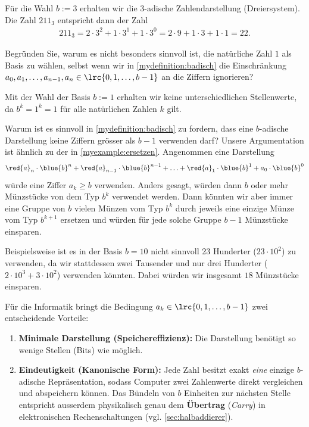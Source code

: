 \begin{myexample}
Für die Wahl $b:=3$ erhalten wir die $3$-adische Zahlendarstellung (Dreiersystem). Die Zahl $211_3$ entspricht dann der Zahl
\begin{align*}
	211_3 = 2\cdot 3^2 + 1\cdot 3^1 + 1\cdot 3^0 = 2\cdot 9 + 1\cdot 3 + 1\cdot 1 = 22.
\end{align*}
\end{myexample}

\begin{mychallenge}
	Begründen Sie, warum es nicht besonders sinnvoll ist, die natürliche Zahl $1$ als Basis zu wählen, selbst wenn wir in \cref{mydefinition:badisch} die Einschränkung $a_0, a_1, \ldots, a_{n-1}, a_{n}\in\lrc{0,1,\ldots,b-1}$ an die Ziffern ignorieren?
	\begin{myanswer}
		Mit der Wahl der Basis $b := 1$ erhalten wir keine unterschiedlichen Stellenwerte, da $b^k = 1^k = 1$ für alle natürlichen Zahlen $k$ gilt.
	\end{myanswer}
\end{mychallenge}

\begin{myremark}\label{myremark:ziffern-einschraenkung}
	Warum ist es sinnvoll in \cref{mydefinition:badisch} zu fordern, dass eine $b$-adische Darstellung keine Ziffern grösser als $b-1$ verwenden darf?
	Unsere Argumentation ist ähnlich zu der in \cref{myexample:ersetzen}. Angenommen eine Darstellung
	\begin{align*}
		\red{a}_n\cdot \blue{b}^n + \red{a}_{n-1}\cdot \blue{b}^{n-1} + \ldots +\red{a}_1\cdot \blue{b}^1 + a_0\cdot
		\blue{b}^0
	\end{align*}
	würde eine Ziffer $a_k \geq b$ verwenden. Anders gesagt, würden dann $b$ oder mehr Münzstücke von dem Typ $b^k$ verwendet werden.
	Dann könnten wir aber immer eine Gruppe von $b$ vielen Münzen vom Typ $b^k$ durch jeweils eine einzige Münze vom Typ $b^{k+1}$ ersetzen und würden für jede solche Gruppe $b-1$ Münzstücke einsparen.

	Beispielsweise ist es in der Basis $b = 10$ nicht sinnvoll 23 Hunderter ($23\cdot 10^2$) zu verwenden, da wir stattdessen zwei Tausender und nur drei Hunderter ($2\cdot 10^3 + 3\cdot 10^2$) verwenden könnten.
	Dabei würden wir insgesamt $18$ Münzstücke einsparen.

	Für die Informatik bringt die Bedingung $a_k \in \lrc{0, 1, \ldots, b-1}$ zwei entscheidende Vorteile:
	\begin{enumerate}[(1)]
		\item \textbf{Minimale Darstellung (Speichereffizienz):} Die Darstellung benötigt so wenige Stellen (Bits) wie möglich.
		\item \textbf{Eindeutigkeit (Kanonische Form):} Jede Zahl besitzt exakt \emph{eine} einzige $b$-adische Repräsentation, sodass Computer zwei Zahlenwerte direkt vergleichen und abspeichern können. Das Bündeln von $b$ Einheiten zur nächsten Stelle entspricht ausserdem physikalisch genau dem \textbf{Übertrag} (\textit{Carry}) in elektronischen Rechenschaltungen (vgl. \cref{sec:halbaddierer}).
	\end{enumerate}
\end{myremark}

